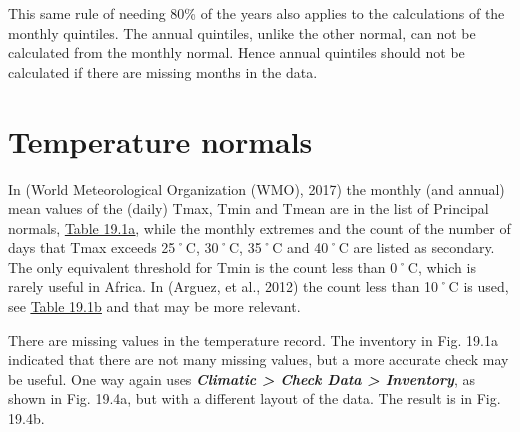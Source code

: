 \documentclass[
  letterpaper,
  DIV=11,
  numbers=noendperiod]{scrreprt}
\begin{document}
This same rule of needing 80\% of the years also applies to the
calculations of the monthly quintiles. The annual quintiles, unlike the
other normal, can not be calculated from the monthly normal. Hence
annual quintiles should not be calculated if there are missing months in
the data.

\section{Temperature normals}\label{temperature-normals}

In (World Meteorological Organization (WMO), 2017) the monthly (and
annual) mean values of the (daily) Tmax, Tmin and Tmean are in the list
of Principal normals, \hyperref[bookmark=id.4anzqyu]{\ul{Table 19.1a}},
while the monthly extremes and the count of the number of days that Tmax
exceeds 25˚C, 30˚C, 35˚C and 40˚C are listed as secondary. The only
equivalent threshold for Tmin is the count less than 0˚C, which is
rarely useful in Africa. In (Arguez, et al., 2012) the count less than
10˚C is used, see \hyperref[bookmark=id.2pta16n]{\ul{Table 19.1b}} and
that may be more relevant.

There are missing values in the temperature record. The inventory in
Fig. 19.1a indicated that there are not many missing values, but a more
accurate check may be useful. One way again uses \textbf{\emph{Climatic
\textgreater{} Check Data \textgreater{} Inventory}}, as shown in Fig.
19.4a, but with a different layout of the data. The result is in Fig.
19.4b.
\end{document}
